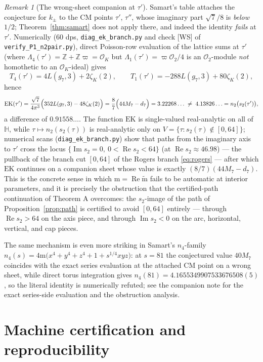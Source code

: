 \documentclass[11pt]{article}
\theoremstyle{definition}
\theoremstyle{remark}
\newtheorem{remark}[theorem]{Remark}
\newcommand{\Hh}{\mathbb{H}}
\newcommand{\Zz}{\mathbb{Z}}
\newcommand{\cL}{\Lambda}
\newcommand{\ImT}{\operatorname{Im}}
\newcommand{\ReT}{\operatorname{Re}}
\newcommand{\OO}{\mathcal{O}}
\newcommand{\m}{\mathrm{m}}
\newcommand{\mt}{\widetilde{\m}}
\begin{document}
\begin{remark}[The wrong-sheet companion at $\tau'$]\label{rem:wrongsheet}
Samart's table \cite{Sa15} attaches the conjecture for $k_\pm$ to the CM
points $\tau'$, $\tau''$, whose imaginary part $\sqrt7/8$ is \emph{below}
$1/2$; Theorem~\ref{thm:samart} does not apply there, and indeed the
identity \emph{fails} at $\tau'$. Numerically (60 dps,
\texttt{diag\_ek\_branch.py} and check [WS] of
\texttt{verify\_P1\_n2pair.py}), direct Poisson-row evaluation of the
lattice sums at $\tau'$ (where $\cL_4(\tau')=\Zz+\Zz\varpi=\OO_K$ but
$\cL_1(\tau')=\varpi\OO_2/4$ is an $\OO_2$-module \emph{not} homothetic to an
$\OO_K$-ideal) gives
\[
  T_4(\tau')=4L(g_7,3)+2\zeta_K(2),\qquad
  T_1(\tau')=-288L(g_7,3)+80\zeta_K(2),
\]
hence
\[
  \mathrm{EK}(\tau')
  =\frac{\sqrt7}{4\pi^3}\Bigl(352L(g_7,3)-48\zeta_K(2)\Bigr)
  =\frac87\Bigl(44M_7-d_7\Bigr)
  =3.22268\ldots
  \;\neq\; 4.13826\ldots=n_2\bigl(s_2(\tau')\bigr),
\]
a difference of $0.91558\ldots$. The function $\mathrm{EK}$ is
single-valued real-analytic on all of $\Hh$, while
$\tau\mapsto n_2(s_2(\tau))$ is real-analytic only on
$V=\{\tau:s_2(\tau)\notin[0,64]\}$; numerical scans
(\texttt{diag\_ek\_branch.py}) show that paths from the imaginary axis to
$\tau'$ cross the locus $\{\ImT s_2=0,\ 0<\ReT s_2<64\}$ (at
$\ReT s_2\approx46.98$) --- the pullback of the branch cut $[0,64]$ of the
Rogers branch \eqref{eq:rogers} --- after which $\mathrm{EK}$ continues on
a companion sheet whose value is exactly $(8/7)(44M_7-d_7)$. This is the
concrete sense in which $\m=\ReT\mt$ fails to be automatic at interior
parameters, and it is precisely the obstruction that the certified-path
continuation of Theorem A overcomes: the $s_2$-image of the path of
Proposition~\ref{prop:path} is certified to avoid $[0,64]$ entirely ---
through $\ReT s_2>64$ on the axis piece, and through $\ImT s_2<0$ on the
arc, horizontal, vertical, and cap pieces.

The same mechanism is even more striking in Samart's $n_4$-family
$n_4(s)=4\m\bigl(x^4+y^4+z^4+1+s^{1/4}xyz\bigr)$: at $s=81$ the
conjectured value $40M_7$ \cite[Table~6]{Sa15} coincides with the exact
series evaluation at the attached CM point on a wrong sheet, while
direct torus integration gives $n_4(81)=4.1655349907533676508(5)$, so
the literal identity is numerically refuted; see the companion note
\cite{Zfn4} for the exact series-side evaluation and the obstruction
analysis.
\end{remark}

\section{Machine certification and reproducibility}\label{sec:cert}
\end{document}
